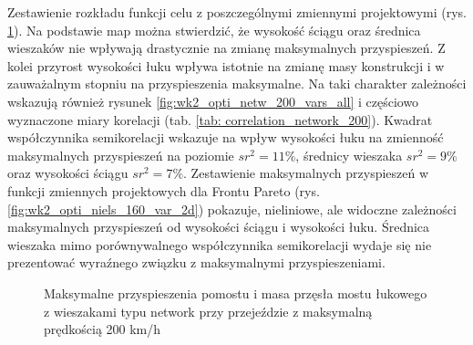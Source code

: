 Zestawienie rozkładu funkcji celu z poszczególnymi zmiennymi projektowymi (rys. \ref{fig:wk2_opti_netw_200_variables}). Na podstawie map można stwierdzić, że wysokość ściągu oraz średnica wieszaków nie wpływają drastycznie na zmianę maksymalnych przyspieszeń. Z kolei przyrost wysokości łuku wpływa istotnie na zmianę masy konstrukcji i w zauważalnym stopniu na przyspieszenia maksymalne. Na taki charakter zależności wskazują również rysunek \ref{fig:wk2_opti_netw_200_vars_all} i częściowo wyznaczone miary korelacji (tab. \ref{tab: correlation_network_200}). Kwadrat współczynnika semikorelacji wskazuje na wpływ wysokości łuku na zmienność maksymalnych przyspieszeń na poziomie $sr^2=11\%$, średnicy wieszaka $sr^2 = 9\%$ oraz wysokości ściągu $sr^2 = 7\%$. Zestawienie maksymalnych przyspieszeń w funkcji zmiennych projektowych dla Frontu Pareto (rys. \ref{fig:wk2_opti_niels_160_var_2d}) pokazuje, nieliniowe, ale widoczne zależności maksymalnych przyspieszeń od wysokości ściągu i wysokości łuku. Średnica wieszaka mimo porównywalnego współczynnika semikorelacji wydaje się nie prezentować wyraźnego związku z maksymalnymi przyspieszeniami.

\begin{figure}[hbt!]
	\centering
	\captionsetup{justification=centering}
	\caption{Maksymalne przyspieszenia pomostu i masa przęsła mostu łukowego z wieszakami typu network przy przejeździe z maksymalną prędkością 200 km/h}
	\label{fig:wk2_opti_netw_200_variables}
\end{figure}

